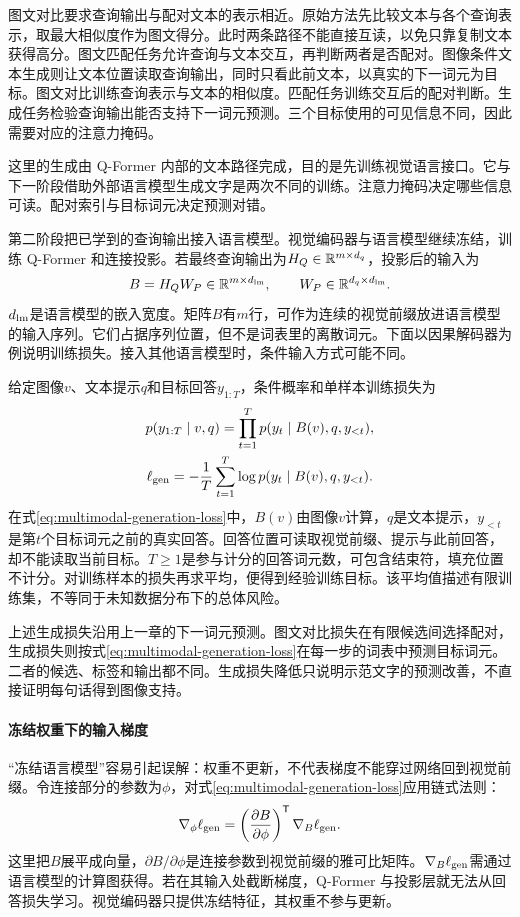 图文对比要求查询输出与配对文本的表示相近。原始方法先比较文本与各个查询表示，取最大相似度作为图文得分。此时两条路径不能直接互读，以免只靠复制文本获得高分。图文匹配任务允许查询与文本交互，再判断两者是否配对。图像条件文本生成则让文本位置读取查询输出，同时只看此前文本，以真实的下一词元为目标。图文对比训练查询表示与文本的相似度。匹配任务训练交互后的配对判断。生成任务检验查询输出能否支持下一词元预测。三个目标使用的可见信息不同，因此需要对应的注意力掩码。

这里的生成由 Q-Former 内部的文本路径完成，目的是先训练视觉语言接口。它与下一阶段借助外部语言模型生成文字是两次不同的训练。注意力掩码决定哪些信息可读。配对索引与目标词元决定预测对错。

第二阶段把已学到的查询输出接入语言模型。视觉编码器与语言模型继续冻结，训练 Q-Former 和连接投影。若最终查询输出为$H_Q\in\mathbb{R}^{m\times d_q}$，投影后的输入为
\begin{equation}
 B=H_QW_P\in\mathbb{R}^{m\times d_{\rm lm}},\qquad
 W_P\in\mathbb{R}^{d_q\times d_{\rm lm}}.
 \label{eq:multimodal-blip-prefix}
\end{equation}
$d_{\rm lm}$是语言模型的嵌入宽度。矩阵$B$有$m$行，可作为连续的视觉前缀放进语言模型的输入序列。它们占据序列位置，但不是词表里的离散词元。下面以因果解码器为例说明训练损失。接入其他语言模型时，条件输入方式可能不同。

给定图像$v$、文本提示$q$和目标回答$y_{1:T}$，条件概率和单样本训练损失为
\begin{gather}
 p(y_{1:T}\mid v,q)
 =\prod_{t=1}^T p(y_t\mid B(v),q,y_{<t}),\\
 \ell_{\rm gen}
 =-\frac1T\sum_{t=1}^T
 \log p(y_t\mid B(v),q,y_{<t}).
 \label{eq:multimodal-generation-loss}
\end{gather}
在式\eqref{eq:multimodal-generation-loss}中，$B(v)$由图像$v$计算，$q$是文本提示，$y_{<t}$是第$t$个目标词元之前的真实回答。回答位置可读取视觉前缀、提示与此前回答，却不能读取当前目标。$T\geq1$是参与计分的回答词元数，可包含结束符，填充位置不计分。对训练样本的损失再求平均，便得到经验训练目标。该平均值描述有限训练集，不等同于未知数据分布下的总体风险。

上述生成损失沿用上一章的下一词元预测。图文对比损失在有限候选间选择配对，生成损失则按式\eqref{eq:multimodal-generation-loss}在每一步的词表中预测目标词元。二者的候选、标签和输出都不同。生成损失降低只说明示范文字的预测改善，不直接证明每句话得到图像支持。

\paragraph{冻结权重下的输入梯度}
“冻结语言模型”容易引起误解：权重不更新，不代表梯度不能穿过网络回到视觉前缀。令连接部分的参数为$\phi$，对式\eqref{eq:multimodal-generation-loss}应用链式法则：
\begin{equation}
 \nabla_\phi\ell_{\rm gen}
 =\left(\frac{\partial B}{\partial\phi}\right)^{\mathsf T}
 \nabla_B\ell_{\rm gen}.
\end{equation}
这里把$B$展平成向量，$\partial B/\partial\phi$是连接参数到视觉前缀的雅可比矩阵。$\nabla_B\ell_{\rm gen}$需通过语言模型的计算图获得。若在其输入处截断梯度，Q-Former 与投影层就无法从回答损失学习。视觉编码器只提供冻结特征，其权重不参与更新。

